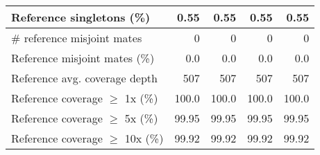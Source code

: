 \documentclass[12pt,a4paper]{article}
\begin{document}
\begin{table}[ht]
\begin{center}
\begin{tabular}{|l*{4}{|r}|}
Reference singletons (\%) & 0.55 & 0.55 & 0.55 & 0.55 \\ \hline
\# reference misjoint mates & 0 & 0 & 0 & 0 \\ \hline
Reference misjoint mates (\%) & 0.0 & 0.0 & 0.0 & 0.0 \\ \hline
Reference avg. coverage depth & 507 & 507 & 507 & 507 \\ \hline
Reference coverage $\geq$ 1x (\%) & 100.0 & 100.0 & 100.0 & 100.0 \\ \hline
Reference coverage $\geq$ 5x (\%) & 99.95 & 99.95 & 99.95 & 99.95 \\ \hline
Reference coverage $\geq$ 10x (\%) & 99.92 & 99.92 & 99.92 & 99.92 \\ \hline
\end{tabular}
\end{center}
\end{table}
\end{document}
